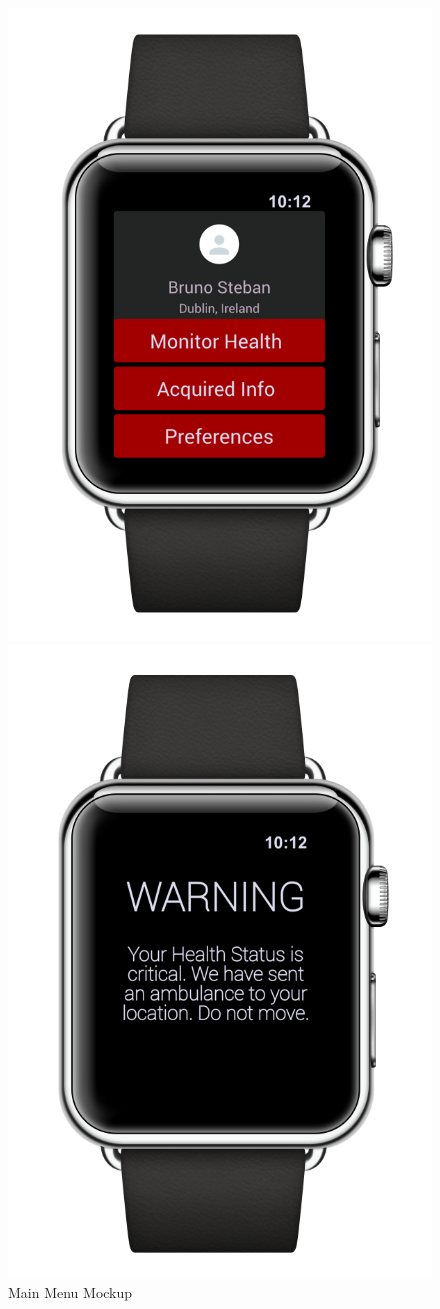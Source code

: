 \begin{enumerate}
\begin{figure}
\begin{center}
\begin{minipage}[c]{.40\textwidth}
          \includegraphics[height=12 cm]{Images/Mockups/AutomatedSOSMockup5.png}
          	\caption{Main Menu Mockup}
        \end{minipage}%
        \hspace{10mm}%
        \begin{minipage}[c]{.40\textwidth}
        \centering
          \includegraphics[height=12 cm]{Images/Mockups/AutomatedSOSMockup7.png}

\end{minipage}
\end{center}
\end{figure}
\end{enumerate}
